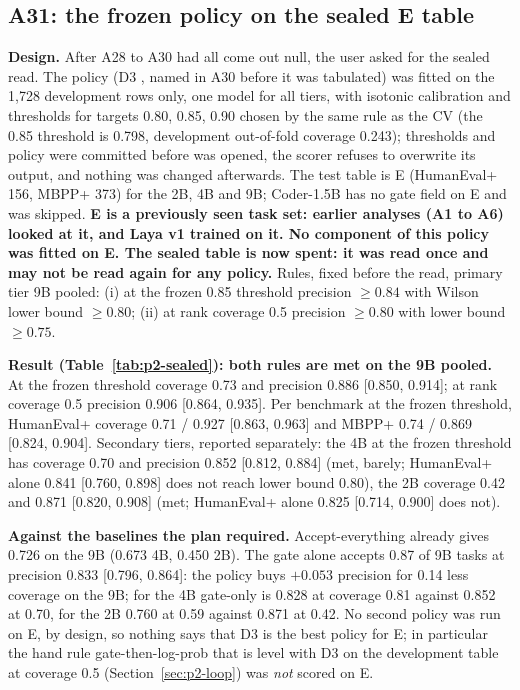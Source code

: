 \documentclass[11pt,a4paper]{article}
\newcommand{\code}[1]{\texttt{\detokenize{#1}}}
\begin{document}
\subsection{A31: the frozen policy on the sealed E table}\label{sec:p2-sealed}

\textbf{Design.} After A28 to A30 had all come out null, the user asked for the sealed read. The policy (D3 \code{lr|core}, named in A30 before it was tabulated) was fitted on the 1,728 development rows only, one model for all tiers, with isotonic calibration and thresholds for targets 0.80, 0.85, 0.90 chosen by the same rule as the CV (the 0.85 threshold is 0.798, development out-of-fold coverage 0.243); thresholds and policy were committed before \code{test_table.jsonl} was opened, the scorer refuses to overwrite its output, and nothing was changed afterwards. The test table is E (HumanEval+ 156, MBPP+ 373) for the 2B, 4B and 9B; Coder-1.5B has no gate field on E and was skipped. \textbf{E is a previously seen task set: earlier analyses (A1 to A6) looked at it, and Laya v1 trained on it. No component of this policy was fitted on E. The sealed table is now spent: it was read once and may not be read again for any policy.} Rules, fixed before the read, primary tier 9B pooled: (i) at the frozen 0.85 threshold precision $\ge0.84$ with Wilson lower bound $\ge0.80$; (ii) at rank coverage 0.5 precision $\ge0.80$ with lower bound $\ge0.75$.

\textbf{Result (Table~\ref{tab:p2-sealed}): both rules are met on the 9B pooled.} At the frozen threshold coverage 0.73 and precision 0.886 [0.850, 0.914]; at rank coverage 0.5 precision 0.906 [0.864, 0.935]. Per benchmark at the frozen threshold, HumanEval+ coverage 0.71 / 0.927 [0.863, 0.963] and MBPP+ 0.74 / 0.869 [0.824, 0.904]. Secondary tiers, reported separately: the 4B at the frozen threshold has coverage 0.70 and precision 0.852 [0.812, 0.884] (met, barely; HumanEval+ alone 0.841 [0.760, 0.898] does not reach lower bound 0.80), the 2B coverage 0.42 and 0.871 [0.820, 0.908] (met; HumanEval+ alone 0.825 [0.714, 0.900] does not).

\textbf{Against the baselines the plan required.} Accept-everything already gives 0.726 on the 9B (0.673 4B, 0.450 2B). The gate alone accepts 0.87 of 9B tasks at precision 0.833 [0.796, 0.864]: the policy buys $+0.053$ precision for 0.14 less coverage on the 9B; for the 4B gate-only is 0.828 at coverage 0.81 against 0.852 at 0.70, for the 2B 0.760 at 0.59 against 0.871 at 0.42. No second policy was run on E, by design, so nothing says that D3 is the best policy for E; in particular the hand rule gate-then-log-prob that is level with D3 on the development table at coverage 0.5 (Section~\ref{sec:p2-loop}) was \emph{not} scored on E.
\end{document}

